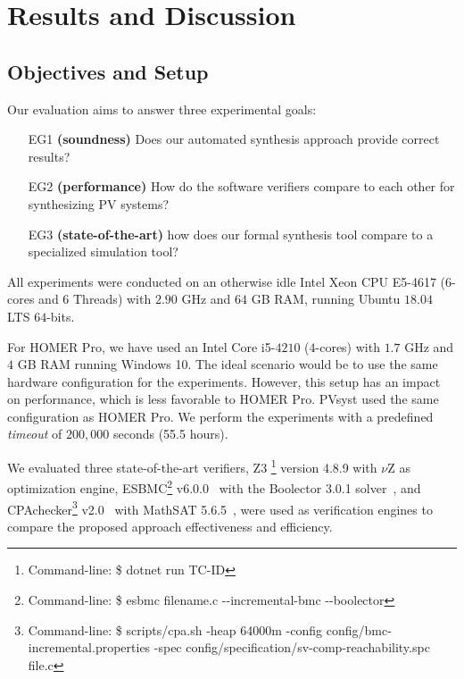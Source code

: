 \documentclass[10pt,journal,compsoc]{IEEEtran}
\begin{document}
\section{Results and Discussion}

\subsection{Objectives and Setup}
\label{ObjectivesAndSetup}

Our evaluation aims to answer three experimental goals: 

\begin{enumerate}
\item [EG1] \textbf{(soundness)} Does our automated synthesis approach provide correct results?
\item [EG2] \textbf{(performance)} How do the software verifiers compare to each other for synthesizing PV systems?
\item [EG3] \textbf{(state-of-the-art)} how does our formal synthesis tool compare to a specialized simulation tool?
\end{enumerate}

All experiments were conducted on an otherwise idle Intel Xeon CPU E5-4617 ($6$-cores and 6 Threads) with $2.90$ GHz and $64$ GB RAM, running Ubuntu $18.04$ LTS $64$-bits. 

For HOMER Pro, we have used an Intel Core i5-$4210$ ($4$-cores) with $1.7$ GHz and $4$ GB RAM running Windows 10. The ideal scenario would be to use the same hardware configuration for the experiments. However, this setup has an impact on performance, which is less favorable to HOMER Pro. PVsyst used the same configuration as HOMER Pro. We perform the experiments with a predefined \textit{timeout} of $200,000$ seconds (55.5 hours).\color{black}

We evaluated three state-of-the-art verifiers, Z3 \footnote{Command-line: \$ dotnet run TC-ID} version 4.8.9 with $\nu$Z as optimization engine, ESBMC\footnote{Command-line: \$ esbmc filename.c -\phantom{}-incremental-bmc -\phantom{}-boolector} v6.0.0~\cite{esbmc2018} with the Boolector 3.0.1 solver~\cite{Brummayer}, and CPAchecker\footnote{Command-line: \$ scripts/cpa.sh -heap 64000m -config config/bmc-incremental.properties -spec config/specification/sv-comp-reachability.spc file.c} v2.0~\cite{Beyer2011} with MathSAT 5.6.5~\cite{mathsat5}, were used as verification engines to compare the proposed approach effectiveness and efficiency.
\end{document}
